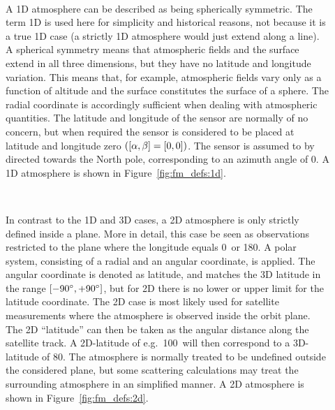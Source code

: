\begin{description}
  
\item[\,\,\,] A 1D atmosphere can be described as being
  spherically symmetric. The term 1D is used here for simplicity and historical
  reasons, not because it is a true 1D case (a strictly 1D atmosphere would
  just extend along a line). A spherical symmetry means that atmospheric fields
  and the surface extend in all three dimensions, but they have no latitude and
  longitude variation. This means that, for example, atmospheric fields vary
  only as a function of altitude and the surface constitutes the surface of a
  sphere. The radial coordinate is accordingly sufficient when dealing with
  atmospheric quantities. The latitude and longitude of the sensor are normally
  of no concern, but when required the sensor is considered to be placed at
  latitude and longitude zero $([\alpha,\beta]=[0,0])$. The sensor is assumed to
  by directed towards the North pole, corresponding to an azimuth angle of
  0\degree. A 1D atmosphere is shown in Figure~\ref{fig:fm_defs:1d}.
  
\item[\,\,\,] In contrast to the 1D and 3D cases, a 2D atmosphere
  is only strictly defined inside a plane. More in detail, this case be seen as
  observations restricted to the plane where the longitude equals 0\degree\ or
  180\degree. A polar system, consisting of a
  radial and an angular coordinate, is applied. The angular coordinate is
  denoted as latitude, and matches the 3D latitude in the range
  $[-90^\circ,+90^\circ]$, but for 2D there is no lower or upper limit for
  the latitude coordinate. The 2D case is most likely used for satellite
  measurements where the atmosphere is observed inside the orbit plane. The 2D
  ``latitude'' can then be taken as the angular distance along the satellite
  track. A 2D-latitude of e.g.\ 100\degree\ will then correspond to a
  3D-latitude of 80\degree. The atmosphere is normally treated to be undefined
  outside the considered plane, but some scattering calculations may treat the
  surrounding atmosphere in an simplified manner. A 2D atmosphere is shown in
  Figure~\ref{fig:fm_defs:2d}.


\end{description}
